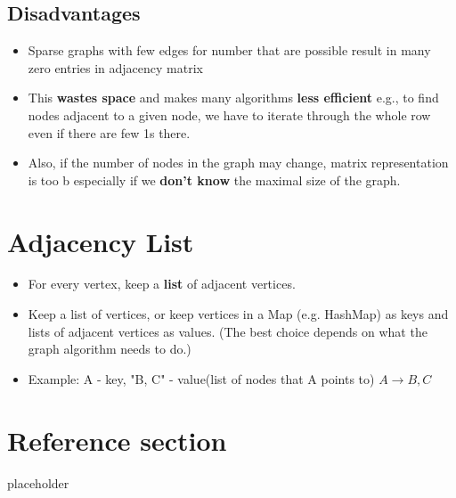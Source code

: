 \documentclass{article}
\begin{document}
\subsection{Disadvantages}
\begin{itemize}
	\item Sparse graphs with few edges for number that are possible result in many zero entries in adjacency matrix
 	\item This \textbf{wastes space} and makes many algorithms \textbf{less efficient}  e.g., to find nodes adjacent to a given node, we have to iterate through the whole row even if there are few 1s there.
 	\item Also, if the number of nodes in the graph may change, matrix representation is too b  especially if we \textbf{don’t know} the maximal size of the graph.
\end{itemize}

\section{Adjacency List}
\begin{itemize}
	\item For every vertex, keep a \textbf{list} of adjacent vertices.
	\item Keep a list of vertices, or keep vertices in a Map (e.g. HashMap) as keys and lists of adjacent vertices as values. (The best choice depends on what the graph algorithm needs to do.)
	\item Example: A - key, "B, C" - value(list of nodes that A points to) $ A \rightarrow B, C$
\end{itemize}

\pagebreak
\section*{Reference section} \label{sec:reference}
\begin{description}
	\item[placeholder] \hfill \\
\end{description}
\end{document}
